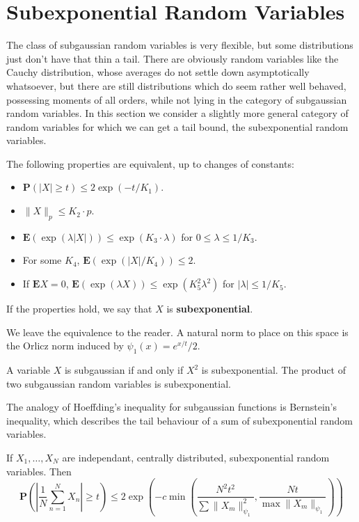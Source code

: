 \section{Subexponential Random Variables}

The class of subgaussian random variables is very flexible, but some distributions just don't have that thin a tail. There are obviously random variables like the Cauchy distribution, whose averages do not settle down asymptotically whatsoever, but there are still distributions which do seem rather well behaved, possessing moments of all orders, while not lying in the category of subgaussian random variables. In this section we consider a slightly more general category of random variables for which we can get a tail bound, the subexponential random variables.

\begin{theorem}
    The following properties are equivalent, up to changes of constants:
    \begin{itemize}
        \item $\mathbf{P}(|X| \geq t) \leq 2 \exp(-t/K_1)$.
        \item $\| X \|_p \leq K_2 \cdot p$.
        \item $\mathbf{E}(\exp(\lambda |X|)) \leq \exp(K_3 \cdot \lambda)$ for $0 \leq \lambda \leq 1/K_3$.
        \item For some $K_4$, $\mathbf{E}(\exp(|X|/K_4)) \leq 2$.
        \item If $\mathbf{E} X = 0$, $\mathbf{E}(\exp(\lambda X)) \leq \exp(K_5^2 \lambda^2)$ for $|\lambda| \leq 1/K_5$.
    \end{itemize}
    If the properties hold, we say that $X$ is {\bf subexponential}.
\end{theorem}

We leave the equivalence to the reader. A natural norm to place on this space is the Orlicz norm induced by $\psi_1(x) = e^{x/t}/2$.

\begin{lemma}
    A variable $X$ is subgaussian if and only if $X^2$ is subexponential. The product of two subgaussian random variables is subexponential.
\end{lemma}

The analogy of Hoeffding's inequality for subgaussian functions is Bernstein's inequality, which describes the tail behaviour of a sum of subexponential random variables.

\begin{theorem}
    If $X_1, \dots, X_N$ are independant, centrally distributed, subexponential random variables. Then
    \[ \mathbf{P} \left( \left| \frac{1}{N} \sum_{n = 1}^N X_n \right| \geq t \right) \leq 2 \exp \left( -c \min \left( \frac{N^2 t^2}{\sum \| X_m \|_{\psi_1}^2}, \frac{N t}{\max \| X_m \|_{\psi_1}} \right) \right) \]
\end{theorem}

